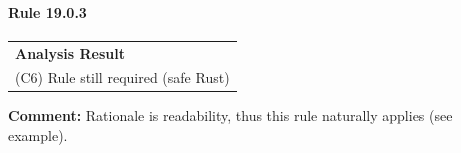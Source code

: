 \paragraph{Rule 19.0.3}
\begin{longtable}{p{13cm}}
\textbf{Analysis Result} \\
(C6) Rule still required (safe Rust) \\
\end{longtable}
\textbf{Comment:} Rationale is readability, thus this rule naturally applies (see example). \\


